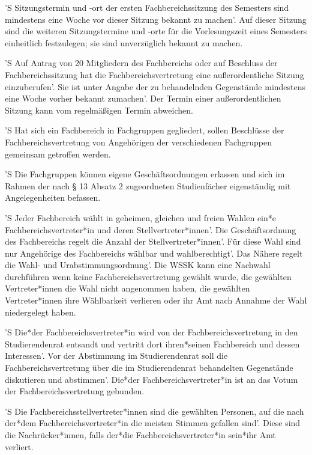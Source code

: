 \documentclass[fontsize=12pt,parskip=half]{scrartcl}
\begin{document}
\begin{contract}
  'S Sitzungstermin und -ort der ersten Fachbereichssitzung des Semesters sind
  mindestens eine Woche vor dieser Sitzung bekannt zu machen'. Auf dieser Sitzung
  sind die weiteren Sitzungstermine und -orte für die Vorlesungszeit eines
  Semesters einheitlich festzulegen; sie sind unverzüglich bekannt zu machen.

  'S Auf Antrag von 20 Mitgliedern des Fachbereichs oder auf Beschluss der
  Fachbereichssitzung hat die Fachbereichsvertretung eine außerordentliche
  Sitzung einzuberufen'. Sie ist unter Angabe der zu behandelnden Gegenstände
  mindestens eine Woche vorher bekannt zumachen'. Der Termin einer
  außerordentlichen Sitzung kann vom regelmäßigen Termin abweichen.



  'S Hat sich ein Fachbereich in Fachgruppen gegliedert, sollen Beschlüsse der
  Fachbereichsvertretung von Angehörigen der verschiedenen Fachgruppen gemeinsam
  getroffen werden.


  'S Die Fachgruppen können eigene Geschäftsordnungen erlassen und sich im Rahmen
  der nach § 13 Absatz 2 zugeordneten Studienfächer eigenständig mit
  Angelegenheiten befassen.



  'S Jeder Fachbereich wählt in geheimen, gleichen und freien Wahlen ein*e
  Fachbereichsvertreter*in und deren Stellvertreter*innen'. Die Geschäftsordnung
  des Fachbereichs regelt die Anzahl der Stellvertreter*innen'. Für diese Wahl
  sind nur Angehörige des Fachbereichs wählbar und wahlberechtigt'. Das Nähere
  regelt die Wahl- und Urabstimmungsordnung'. Die WSSK kann eine Nachwahl
  durchführen wenn keine Fachbereichsvertretung gewählt wurde, die gewählten
  Vertreter*innen die Wahl nicht angenommen haben, die gewählten Vertreter*innen
  ihre Wählbarkeit verlieren oder ihr Amt nach Annahme der Wahl niedergelegt
  haben.


  'S Die*der Fachbereichsvertreter*in wird von der Fachbereichsvertretung in den
  Studierendenrat entsandt und vertritt dort ihren*seinen Fachbereich und dessen
  Interessen'. Vor der Abstimmung im Studierendenrat soll die
  Fachbereichsvertretung über die im Studierendenrat behandelten Gegenstände
  diskutieren und abstimmen'. Die*der Fachbereichsvertreter*in ist an das Votum
  der Fachbereichsvertretung gebunden.

  'S Die Fachbereichsstellvertreter*innen sind die gewählten Personen, auf die nach
  der*dem Fachbereichsvertreter*in die meisten Stimmen gefallen sind'. Diese sind
  die Nachrücker*innen, falls der*die Fachbereichsvertreter*in sein*ihr Amt
  verliert.


\end{contract}
\end{document}
